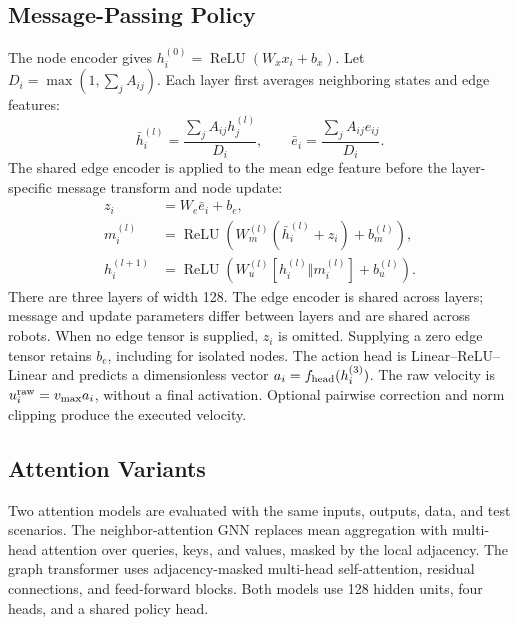 \documentclass[conference]{IEEEtran}
\begin{document}
\subsection{Message-Passing Policy}
The node encoder gives $h_i^{(0)}=\operatorname{ReLU}(W_xx_i+b_x)$.
Let $D_i=\max(1,\sum_jA_{ij})$. Each layer first averages neighboring
states and edge features:
\begin{equation}
\bar h_i^{(l)}=\frac{\sum_jA_{ij}h_j^{(l)}}{D_i},\qquad
\bar e_i=\frac{\sum_jA_{ij}e_{ij}}{D_i}.
\end{equation}
The shared edge encoder is applied to the mean edge feature before the
layer-specific message transform and node update:
\begin{equation}
\begin{aligned}
z_i&=W_e\bar e_i+b_e,\\
m_i^{(l)}&=\operatorname{ReLU}\!\left(W_m^{(l)}(\bar h_i^{(l)}+z_i)+b_m^{(l)}\right),\\
h_i^{(l+1)}&=\operatorname{ReLU}\!\left(W_u^{(l)}[h_i^{(l)}\Vert m_i^{(l)}]+b_u^{(l)}\right).
\end{aligned}
\end{equation}
There are three layers of width 128. The edge encoder is shared across
layers; message and update parameters differ between layers and are shared
across robots. When no edge tensor is supplied, $z_i$ is omitted. Supplying
a zero edge tensor retains $b_e$, including for isolated nodes.
The action head is Linear--ReLU--Linear and predicts a dimensionless vector
$a_i=f_{\rm head}(h_i^{(3)})$. The raw velocity is
$u_i^{\rm raw}=v_{\max}a_i$, without a final activation. Optional pairwise
correction and norm clipping produce the executed velocity.

\subsection{Attention Variants}
Two attention models are evaluated with the same inputs, outputs, data,
and test scenarios. The neighbor-attention GNN replaces mean aggregation
with multi-head attention over queries, keys, and values, masked by the local
adjacency. The graph transformer uses adjacency-masked multi-head
self-attention, residual connections, and feed-forward blocks. Both models
use 128 hidden units, four heads, and a shared policy head.
\end{document}
